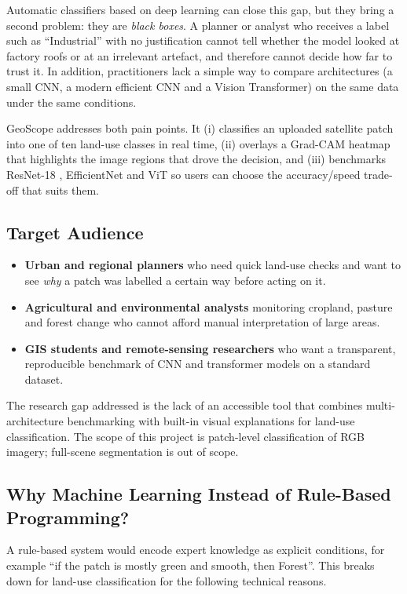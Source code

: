 \documentclass[11pt,a4paper]{article}
\begin{document}
Automatic classifiers based on deep learning can close this gap, but they bring a second problem:
they are \emph{black boxes}. A planner or analyst who receives a label such as ``Industrial'' with no
justification cannot tell whether the model looked at factory roofs or at an irrelevant artefact,
and therefore cannot decide how far to trust it. In addition, practitioners lack a simple way to
compare architectures (a small CNN, a modern efficient CNN and a Vision Transformer) on the same
data under the same conditions.

GeoScope addresses both pain points. It (i) classifies an uploaded satellite patch into one of ten
land-use classes in real time, (ii) overlays a Grad-CAM heatmap that highlights the image regions
that drove the decision, and (iii) benchmarks ResNet-18 \cite{he2016}, EfficientNet \cite{tan2019} and ViT \cite{dosovitskiy2021} so users can choose
the accuracy/speed trade-off that suits them.

\subsection{Target Audience}
\begin{itemize}[nosep]
  \item \textbf{Urban and regional planners} who need quick land-use checks and want to see
        \emph{why} a patch was labelled a certain way before acting on it.
  \item \textbf{Agricultural and environmental analysts} monitoring cropland, pasture and forest
        change who cannot afford manual interpretation of large areas.
  \item \textbf{GIS students and remote-sensing researchers} who want a transparent, reproducible
        benchmark of CNN and transformer models on a standard dataset.
\end{itemize}
The research gap addressed is the lack of an accessible tool that combines multi-architecture
benchmarking with built-in visual explanations for land-use classification. The scope of this
project is patch-level classification of RGB imagery; full-scene segmentation is out of scope.

\subsection{Why Machine Learning Instead of Rule-Based Programming?}
A rule-based system would encode expert knowledge as explicit conditions, for example
``if the patch is mostly green and smooth, then Forest''. This breaks down for land-use
classification for the following technical reasons.
\end{document}
